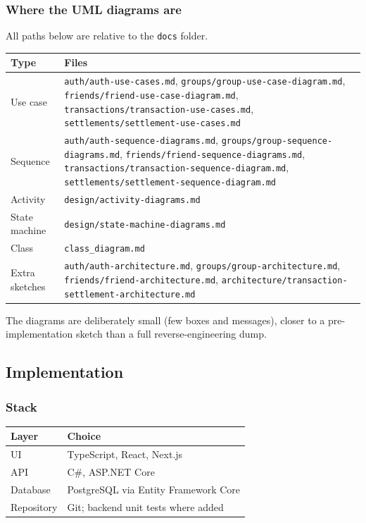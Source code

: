\documentclass[11pt,a4paper]{article}
\begin{document}
\subsubsection{Where the UML diagrams are}

\noindent All paths below are relative to the \texttt{docs} folder.

\begin{center}
\small
\begin{tabular}{@{}p{}p{}@{}}
\toprule
\textbf{Type} & \textbf{Files} \\
\midrule
Use case & \texttt{auth/auth-use-cases.md}, \texttt{groups/group-use-case-diagram.md}, \texttt{friends/friend-use-case-diagram.md}, \texttt{transactions/transaction-use-cases.md}, \texttt{settlements/settlement-use-cases.md} \\
Sequence & \texttt{auth/auth-sequence-diagrams.md}, \texttt{groups/group-sequence-diagrams.md}, \texttt{friends/friend-sequence-diagrams.md}, \texttt{transactions/transaction-sequence-diagram.md}, \texttt{settlements/settlement-sequence-diagram.md} \\
Activity & \texttt{design/activity-diagrams.md} \\
State machine & \texttt{design/state-machine-diagrams.md} \\
Class & \texttt{class\_diagram.md} \\
Extra sketches & \texttt{auth/auth-architecture.md}, \texttt{groups/group-architecture.md}, \texttt{friends/friend-architecture.md}, \texttt{architecture/transaction-settlement-architecture.md} \\
\bottomrule
\end{tabular}
\end{center}

\vspace{0.5em}
\noindent The diagrams are deliberately small (few boxes and messages), closer to a pre-implementation sketch than a full reverse-engineering dump.

\subsection{Implementation}

\subsubsection{Stack}

\begin{center}
\begin{tabular}{@{}ll@{}}
\toprule
\textbf{Layer} & \textbf{Choice} \\
\midrule
UI & TypeScript, React, Next.js \\
API & C\#, ASP.NET Core \\
Database & PostgreSQL via Entity Framework Core \\
Repository & Git; backend unit tests where added \\
\bottomrule
\end{tabular}
\end{center}
\end{document}
